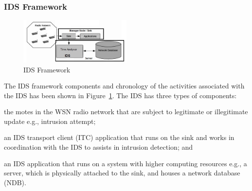 \documentclass[conference,final]{IEEEtran}
\begin{document}
\subsubsection*{IDS Framework}
\label{ssc:ids_fw}
\begin{figure}[btp]
    \centering
    \includegraphics[width=0.5\textwidth]{IDS_fw}	
    \caption{IDS Framework}
    \label{fig:ids_fw}
\end{figure}
The IDS framework components and chronology of the activities associated with the IDS has been shown in Figure~\ref{fig:ids_fw}.
The IDS has three types of components:
\begin{inparaenum}
\item the motes in the WSN radio network that are subject to legitimate or illegitimate update e.g., intrusion attempt; 
\item an IDS transport client (ITC) application that runs on the sink and works in coordination with the IDS to assists in intrusion detection; and
\item an IDS application that runs on a system with higher computing resources e.g., a server, which is physically attached to the sink, and houses a network database (NDB).
\end{inparaenum}
\end{document}
